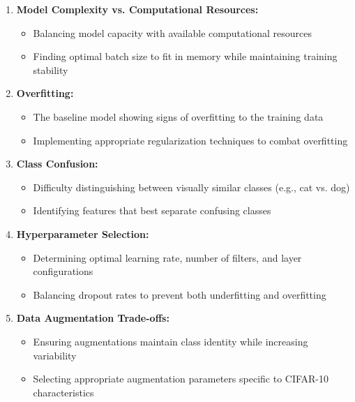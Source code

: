 \documentclass[12pt]{article}
\begin{document}
\begin{enumerate}
    \item \textbf{Model Complexity vs. Computational Resources:}
    \begin{itemize}
        \item Balancing model capacity with available computational resources
        \item Finding optimal batch size to fit in memory while maintaining training stability
    \end{itemize}
    
    \item \textbf{Overfitting:}
    \begin{itemize}
        \item The baseline model showing signs of overfitting to the training data
        \item Implementing appropriate regularization techniques to combat overfitting
    \end{itemize}
    
    \item \textbf{Class Confusion:}
    \begin{itemize}
        \item Difficulty distinguishing between visually similar classes (e.g., cat vs. dog)
        \item Identifying features that best separate confusing classes
    \end{itemize}
    
    \item \textbf{Hyperparameter Selection:}
    \begin{itemize}
        \item Determining optimal learning rate, number of filters, and layer configurations
        \item Balancing dropout rates to prevent both underfitting and overfitting
    \end{itemize}
    
    \item \textbf{Data Augmentation Trade-offs:}
    \begin{itemize}
        \item Ensuring augmentations maintain class identity while increasing variability
        \item Selecting appropriate augmentation parameters specific to CIFAR-10 characteristics
    \end{itemize}
\end{enumerate}
\end{document}
